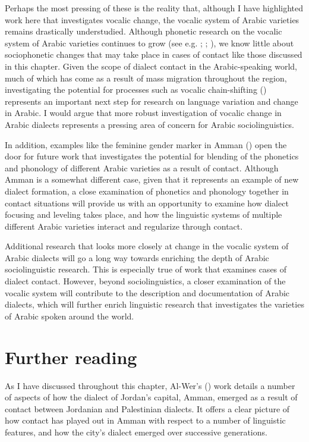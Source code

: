\documentclass[output=paper]{langsci/langscibook}
\begin{document}
  Perhaps the most pressing of these is the reality that, although I have highlighted work here that investigates vocalic change, the vocalic system of Arabic varieties remains drastically understudied. Although phonetic research on the vocalic system of Arabic varieties continues to grow (see e.g. \citealt{HassanHeselwood2011}; \citealt{KhattabAl-Tamimi2014}; \citealt{Al-TamimiKhattab2015}), we know little about sociophonetic changes that may take place in cases of contact like those discussed in this chapter. Given the scope of dialect contact in the Arabic-speaking world, much of which has come as a result of mass migration throughout the region, investigating the potential for processes such as vocalic chain-shifting (\citealt{Al-Wer2007}) represents an important next step for research on language variation and change in Arabic. I would argue that more robust investigation of vocalic change in Arabic dialects represents a pressing area of concern for Arabic sociolinguistics. 

  In addition, examples like the feminine gender marker in Amman (\citealt{Al-Wer2007}) open the door for future work that investigates the potential for blending of the phonetics and phonology of different Arabic varieties as a result of contact. Although Amman is a somewhat different case, given that it represents an example of new dialect formation, a close examination of phonetics and phonology together in contact situations will provide us with an opportunity to examine how dialect focusing and leveling takes place, and how the linguistic systems of multiple different Arabic varieties interact and regularize through contact. 

  Additional research that looks more closely at change in the vocalic system of Arabic dialects will go a long way towards enriching the depth of Arabic sociolinguistic research. This is especially true of work that examines cases of dialect contact. However, beyond sociolinguistics, a closer examination of the vocalic system will contribute to the description and documentation of Arabic dialects, which will further enrich linguistic research that investigates the varieties of Arabic spoken around the world. 

\section*{Further reading}

As I have discussed throughout this chapter, Al-Wer's (\citeyear{Al-Wer2007}) work details a number of aspects of how the dialect of Jordan’s capital, Amman, emerged as a result of contact between Jordanian and Palestinian dialects. It offers a clear picture of how contact has played out in Amman with respect to a number of linguistic features, and how the city’s dialect emerged over successive generations. 
\end{document}
